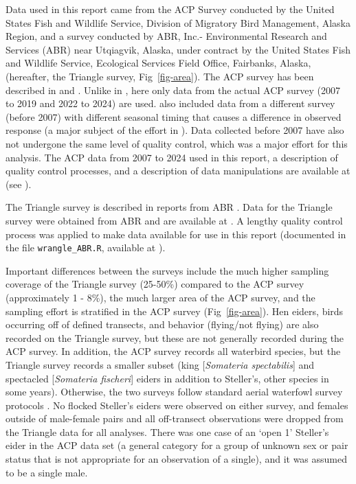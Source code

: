 \documentclass[
  10pt,
  letterpaper,
]{article}
\begin{document}
Data used in this report came from the ACP Survey conducted by the
United States Fish and Wildlife Service, Division of Migratory Bird
Management, Alaska Region, and a survey conducted by ABR, Inc.-
Environmental Research and Services (ABR) near Utqiagvik, Alaska, under
contract by the United States Fish and Wildlife Service, Ecological
Services Field Office, Fairbanks, Alaska, (hereafter, the Triangle
survey, Fig~\ref{fig-area}). The ACP survey has been described in
\citep{amundson2019} and \citep{wilson2025population}. Unlike in
\citep{amundson2019}, here only data from the actual ACP survey (2007 to
2019 and 2022 to 2024) are used. \citep{amundson2019} also included data
from a different survey (before 2007) with different seasonal timing
that causes a difference in observed response (a major subject of the
effort in \citep{amundson2019}). Data collected before 2007 have also
not undergone the same level of quality control, which was a major
effort for this analysis. The ACP data from 2007 to 2024 used in this
report, a description of quality control processes, and a description of
data manipulations are available at \citep{osnas-github}
\citep{osnasACP} (see ).

The Triangle survey is described in reports from ABR
\citep{obritschkewitsch2008steller} \citep{triangleABR}. Data for the
Triangle survey were obtained from ABR and are available at
. A lengthy quality control process was applied to
make data available for use in this report (documented in the file
\texttt{wrangle\_ABR.R}, available at ).

Important differences between the surveys include the much higher
sampling coverage of the Triangle survey (25-50\%) compared to the ACP
survey (approximately 1 - 8\%), the much larger area of the ACP survey,
and the sampling effort is stratified in the ACP survey
(Fig~\ref{fig-area}). Hen eiders, birds occurring off of defined
transects, and behavior (flying/not flying) are also recorded on the
Triangle survey, but these are not generally recorded during the ACP
survey. In addition, the ACP survey records all waterbird species, but
the Triangle survey records a smaller subset (king {[}\emph{Somateria
spectabilis}{]} and spectacled {[}\emph{Somateria fischeri}{]} eiders in
addition to Steller's, other species in some years). Otherwise, the two
surveys follow standard aerial waterfowl survey protocols
\citep{cws1987}. No flocked Steller's eiders were observed on either
survey, and females outside of male-female pairs and all off-transect
observations were dropped from the Triangle data for all analyses. There
was one case of an `open 1' Steller's eider in the ACP data set (a
general category for a group of unknown sex or pair status that is not
appropriate for an observation of a single), and it was assumed to be a
single male.
\end{document}
